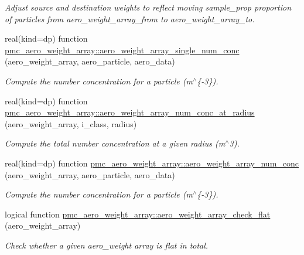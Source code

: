 \begin{DoxyCompactItemize}
\begin{DoxyCompactList}\small\item\em Adjust source and destination weights to reflect moving {\ttfamily sample\+\_\+prop} proportion of particles from {\ttfamily aero\+\_\+weight\+\_\+array\+\_\+from} to {\ttfamily aero\+\_\+weight\+\_\+array\+\_\+to}. \end{DoxyCompactList}\item 
real(kind=dp) function \mbox{\hyperlink{namespacepmc__aero__weight__array_adb38b8169574f5d8e3fa131ccdf1dcb4}{pmc\+\_\+aero\+\_\+weight\+\_\+array\+::aero\+\_\+weight\+\_\+array\+\_\+single\+\_\+num\+\_\+conc}} (aero\+\_\+weight\+\_\+array, aero\+\_\+particle, aero\+\_\+data)
\begin{DoxyCompactList}\small\item\em Compute the number concentration for a particle (m$^\wedge$\{-\/3\}). \end{DoxyCompactList}\item 
real(kind=dp) function \mbox{\hyperlink{namespacepmc__aero__weight__array_a8a39b084f2952ba5f1068eadac2c48ed}{pmc\+\_\+aero\+\_\+weight\+\_\+array\+::aero\+\_\+weight\+\_\+array\+\_\+num\+\_\+conc\+\_\+at\+\_\+radius}} (aero\+\_\+weight\+\_\+array, i\+\_\+class, radius)
\begin{DoxyCompactList}\small\item\em Compute the total number concentration at a given radius (m$^\wedge$3). \end{DoxyCompactList}\item 
real(kind=dp) function \mbox{\hyperlink{namespacepmc__aero__weight__array_a58a8646015dbbed5447fe415353b8e29}{pmc\+\_\+aero\+\_\+weight\+\_\+array\+::aero\+\_\+weight\+\_\+array\+\_\+num\+\_\+conc}} (aero\+\_\+weight\+\_\+array, aero\+\_\+particle, aero\+\_\+data)
\begin{DoxyCompactList}\small\item\em Compute the number concentration for a particle (m$^\wedge$\{-\/3\}). \end{DoxyCompactList}\item 
logical function \mbox{\hyperlink{namespacepmc__aero__weight__array_ad145b87a8e1a71fda62dadb01b4cff39}{pmc\+\_\+aero\+\_\+weight\+\_\+array\+::aero\+\_\+weight\+\_\+array\+\_\+check\+\_\+flat}} (aero\+\_\+weight\+\_\+array)
\begin{DoxyCompactList}\small\item\em Check whether a given aero\+\_\+weight array is flat in total. \end{DoxyCompactList}\item 

\end{DoxyCompactItemize}
